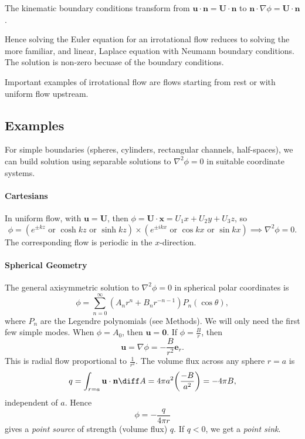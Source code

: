 \documentclass[12pt]{article}
\begin{document}
The kinematic boundary conditions transform from $\mathbf{u} \cdot \mathbf{n} = \mathbf{U} \cdot \mathbf{n}$ to $\mathbf{n} \cdot \nabla \phi = \mathbf{U} \cdot \mathbf{n}$.

Hence solving the Euler equation for an irrotational flow reduces to solving the more familiar, and linear, Laplace equation with Neumann boundary conditions. The solution is non-zero becuase of the boundary conditions.

Important examples of irrotational flow are flows starting from rest or with uniform flow upstream.

\subsection{Examples}
\label{sub:invicid_vorticity_examples}

For simple boundaries (spheres, cylinders, rectangular channels, half-spaces), we can build solution using separable solutions to $\nabla^2 \phi = 0$ in suitable coordinate systems.

\paragraph{Cartesians} In uniform flow, with $\mathbf{u} = \mathbf{U}$, then $\phi = \mathbf{U} \cdot \mathbf{x} = U_1x + U_2y + U_3z$, so
\[
	\phi = (e^{\pm kz} \text{ or } \cosh kz \text{ or } \sinh kz) \times (e^{\pm ikx} \text{ or } \cos kx \text{ or } \sin kx) \implies \nabla^2 \phi = 0.
\]
The corresponding flow is periodic in the $x$-direction.

\paragraph{Spherical Geometry} The general axisymmetric solution to $\nabla^2 \phi = 0$ in spherical polar coordinates is
\[
\phi = \sum_{n = 0}^{\infty} (A_n r^{n} + B_n r^{-n-1}) P_n(\cos \theta),
\]
where $P_n$ are the Legendre polynomials (see Methods). We will only need the first few simple modes. When $\phi = A_0$, then $\mathbf{u} = \mathbf{0}$. If $\phi = \frac{B}{r}$, then
\[
\mathbf{u} = \nabla \phi = - \frac{B}{r^2} \mathbf{e}_r.
\]
This is radial flow proportional to $\frac{1}{r^2}$. The volume flux across any sphere $r = a$ is
\[
	q = \int_{r = a}\mathbf{u} \cdot \mathbf{n} \diff A = 4 \pi a^2 \biggl(\frac{-B}{a^2} \biggr) = - 4 \pi B,
\]
independent of $a$. Hence
\[
\phi = - \frac{q}{4 \pi r}
\]
gives a \emph{point source} of strength (volume flux) $q$. If $q < 0$, we get a \emph{point sink}.
\end{document}
